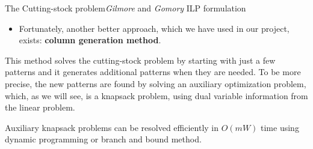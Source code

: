\documentclass[10pt]{beamer}
\begin{document}
\begin{frame}{The Cutting-stock problem}{\textit{Gilmore} and \textit{Gomory} ILP formulation}

\begin{itemize}
\item Fortunately, another better approach, which we have used in our project, exists: \textbf{column generation method}.
\end{itemize}

This method solves the cutting-stock problem by starting with just a few patterns and it generates additional patterns when they are needed. To be more precise, the new patterns are found by solving an auxiliary optimization problem, which, as we will see, is a knapsack problem, using dual variable information from the linear problem. 

Auxiliary knapsack problems can be resolved efficiently in $O(mW)$ time using dynamic programming or branch and bound method.

\end{frame}



{\1
\begin{frame}
\end{frame}}
\end{document}
